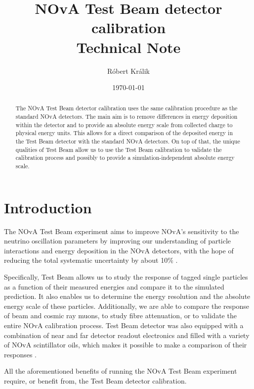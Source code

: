 \documentclass[12pt,a4paper]{article}
\author[1]{Róbert Králik}
\affil[1]{University of Sussex, Brighton, UK}
\title{\textbf{NOvA Test Beam detector calibration\\ \vspace*{5mm}
\Large{Technical Note}}}
\date{\today}
\begin{document}
\maketitle
\thispagestyle{empty} %
\begin{abstract}
The NOvA Test Beam detector calibration uses the same calibration procedure as the standard NOvA detectors. The main aim is to remove differences in energy deposition within the detector and to provide an absolute energy scale from collected charge to physical energy units. This allows for a direct comparison of the deposited energy in the Test Beam detector with the standard NOvA detectors. On top of that, the unique qualities of Test Beam allow us to use the Test Beam calibration to validate the calibration process and possibly to provide a simulation-independent absolute energy scale.
\end{abstract}
\newpage

\thispagestyle{empty} %
\tableofcontents
\newpage
{} %

\section{Introduction}

The NOvA Test Beam experiment aims to improve NOvA's sensitivity to the neutrino oscillation parameters by improving our understanding of particle interactions and energy deposition in the NOvA detectors, with the hope of reducing the total systematic uncertainty by about 10\% \cite{NOVA-doc-33012}.
 
Specifically, Test Beam allows us to study the response of tagged single particles as a function of their measured energies and compare it to the simulated prediction. It also enables us to determine the energy resolution and the absolute energy scale of these particles. Additionally, we are able to compare the response of beam and cosmic ray muons, to study fibre attenuation, or to validate the entire NOvA calibration process. Test Beam detector was also equipped with a combination of near and far detector readout electronics and filled with a variety of NOvA scintillator oils, which makes it possible to make a comparison of their responses \cite{NOVA-doc-15750}.

All the aforementioned benefits of running the NOvA Test Beam experiment require, or benefit from, the Test Beam detector calibration.
\end{document}
